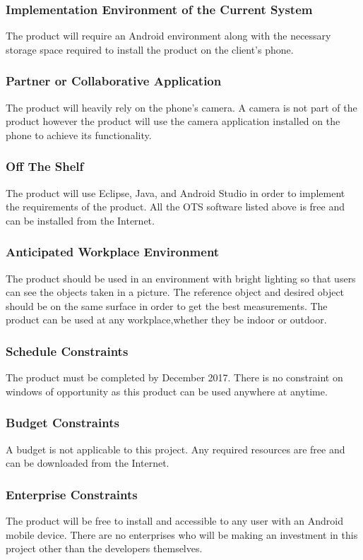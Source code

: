 \documentclass[12pt, titlepage]{article}
\begin{document}
\subsubsection{Implementation Environment of the Current System}
The product will require an Android environment along with the necessary storage space required to install the product on the client’s phone.

\subsubsection{Partner or Collaborative Application}
The product will heavily rely on the phone’s camera. A camera is not part of the product however the product will use the camera application installed on the phone to achieve its functionality.

\subsubsection{Off The Shelf}
The product will use Eclipse, Java, and Android Studio in order to implement the requirements of the product. All the OTS software listed above is free and can be installed from the Internet.

\subsubsection{Anticipated Workplace Environment}
The product should be used in an environment with bright lighting so that users can see the objects taken in a picture. The reference object and desired object should be on the same surface in order to get the best measurements. The product can be used at any workplace,whether they be indoor or outdoor. 

\subsubsection{Schedule Constraints}
The product must be completed by December 2017. There is no constraint on windows of opportunity as this product can be used anywhere at anytime. 

\subsubsection{Budget Constraints}
A budget is not applicable to this project. Any required resources are free and can be downloaded from the Internet.

\subsubsection{Enterprise Constraints}
The product will be free to install and accessible to any user with an Android mobile device. There are no enterprises who will be making an investment in this project other than the developers themselves.
\end{document}
